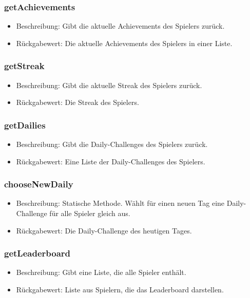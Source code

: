\documentclass[a4paper]{scrreprt}
\begin{document}
	\subsubsection{getAchievements}
	\begin{itemize}
		\item Beschreibung: Gibt die aktuelle Achievements des Spielers zurück.
		\item Rückgabewert: Die aktuelle Achievements des Spielers in einer Liste.
	\end{itemize}
	\subsubsection{getStreak}
	\begin{itemize}
		\item Beschreibung: Gibt die aktuelle Streak des Spielers zurück.
		\item Rückgabewert: Die Streak des Spielers.
	\end{itemize}
	\subsubsection{getDailies}
	\begin{itemize}
		\item Beschreibung: Gibt die Daily-Challenges des Spielers zurück.
		\item Rückgabewert: Eine Liste der Daily-Challenges des Spielers.
	\end{itemize}
	\subsubsection{chooseNewDaily}
	\begin{itemize}
		\item Beschreibung: Statische Methode. Wählt für einen neuen Tag eine Daily-Challenge für alle Spieler gleich aus.
		\item Rückgabewert: Die Daily-Challenge des heutigen Tages.
	\end{itemize}
	\subsubsection{getLeaderboard}
	\begin{itemize}
		\item Beschreibung: Gibt eine Liste, die alle Spieler enthält.
		\item Rückgabewert: Liste aus Spielern, die das Leaderboard darstellen.
	\end{itemize}
\end{document}
